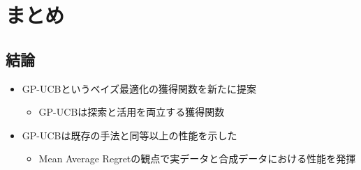 \documentclass[dvipdfmx, 10.5pt]{beamer}
\begin{document}
\section{まとめ}


\subsection{結論}

\begin{frame}{\insertsubsection}
	\begin{itemize}
		\item GP-UCBというベイズ最適化の獲得関数を新たに提案
		\begin{itemize}
			\item GP-UCBは探索と活用を両立する獲得関数
		\end{itemize}
		\item GP-UCBは既存の手法と同等以上の性能を示した
		\begin{itemize}
			\item Mean Average Regretの観点で実データと合成データにおける性能を発揮
		\end{itemize}
	\end{itemize}

\end{frame}




\end{document}
